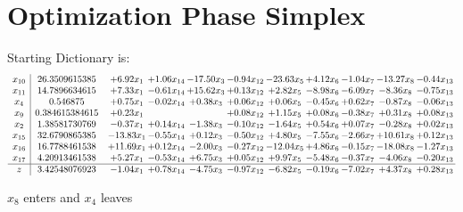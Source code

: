 \documentclass[9pt]{article}
\begin{document}
\section{Optimization Phase Simplex}
Starting Dictionary is:
\[\begin{array}{c| c c@{\hskip 2pt} c@{\hskip 2pt} c@{\hskip 2pt} c@{\hskip 2pt} c@{\hskip 2pt} c@{\hskip 2pt} c@{\hskip 2pt} c@{\hskip 2pt} c@{\hskip 2pt} }
 x_{10}   &  26.3509615385 & +  6.92 x_{1} & +  1.06 x_{14} & -17.50 x_{3} & -0.94 x_{12} & -23.63 x_{5} & +  4.12 x_{6} & -1.04 x_{7} & -13.27 x_{8} & -0.44 x_{13}\\
 x_{11}   &  14.7896634615 & +  7.33 x_{1} & -0.61 x_{14} & + 15.62 x_{3} & +  0.13 x_{12} & +  2.82 x_{5} & -8.98 x_{6} & -6.09 x_{7} & -8.36 x_{8} & -0.75 x_{13}\\
 x_{4}   &  0.546875 & +  0.75 x_{1} & -0.02 x_{14} & +  0.38 x_{3} & +  0.06 x_{12} & +  0.06 x_{5} & -0.45 x_{6} & +  0.62 x_{7} & -0.87 x_{8} & -0.06 x_{13}\\
 x_{9}   &  0.384615384615 & +  0.23 x_{1} &    &   & +  0.08 x_{12} & +  1.15 x_{5} & +  0.08 x_{6} & -0.38 x_{7} & +  0.31 x_{8} & +  0.08 x_{13}\\
 x_{2}   &  1.38581730769 & -0.37 x_{1} & +  0.14 x_{14} & -1.38 x_{3} & -0.10 x_{12} & -1.64 x_{5} & +  0.54 x_{6} & +  0.07 x_{7} & -0.28 x_{8} & +  0.02 x_{13}\\
 x_{15}   &  32.6790865385 & -13.83 x_{1} & -0.55 x_{14} & +  0.12 x_{3} & -0.50 x_{12} & +  4.80 x_{5} & -7.55 x_{6} & -2.66 x_{7} & + 10.61 x_{8} & +  0.12 x_{13}\\
 x_{16}   &  16.7788461538 & + 11.69 x_{1} & +  0.12 x_{14} & -2.00 x_{3} & -0.27 x_{12} & -12.04 x_{5} & +  4.86 x_{6} & -0.15 x_{7} & -18.08 x_{8} & -1.27 x_{13}\\
 x_{17}   &  4.20913461538 & +  5.27 x_{1} & -0.53 x_{14} & +  6.75 x_{3} & +  0.05 x_{12} & +  9.97 x_{5} & -5.48 x_{6} & -0.37 x_{7} & -4.06 x_{8} & -0.20 x_{13}\\
\hline
z    &  3.42548076923 & -1.04 x_{1} & +  0.78 x_{14} & -4.75 x_{3} & -0.97 x_{12} & -6.82 x_{5} & -0.19 x_{6} & -7.02 x_{7} & +  4.37 x_{8} & +  0.28 x_{13}\\
\end{array}\]


 $ x_{8} $ enters and $ x_{4} $ leaves 
\end{document}
